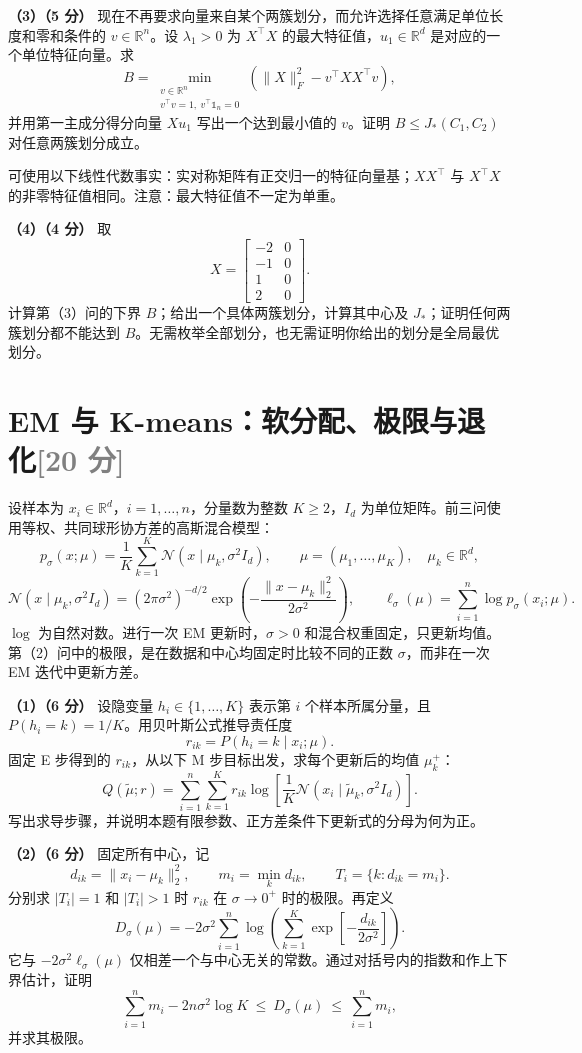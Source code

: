 \documentclass[11pt,a4paper]{article}
\newcommand{\R}{\mathbb R}
\newcommand{\partq}[2]{\par\Needspace{6\baselineskip}\noindent\textbf{（#1）（#2 分）}}
\begin{document}
\partq{3}{5} 现在不再要求向量来自某个两簇划分，而允许选择任意满足单位长度和零和条件的 $v\in\R^n$。设 $\lambda_1>0$ 为 $X^\top X$ 的最大特征值，$u_1\in\R^d$ 是对应的一个单位特征向量。求
\[
B=\min_{\substack{v\in\R^n\\v^\top v=1,\ v^\top\mathds{1}_n=0}}
\left(\|X\|_F^2-v^\top XX^\top v\right),
\]
并用第一主成分得分向量 $Xu_1$ 写出一个达到最小值的 $v$。证明 $B\leq J_*(C_1,C_2)$ 对任意两簇划分成立。

可使用以下线性代数事实：实对称矩阵有正交归一的特征向量基；$XX^\top$ 与 $X^\top X$ 的非零特征值相同。注意：最大特征值不一定为单重。

\partq{4}{4} 取
\[
X=\begin{bmatrix}-2&0\\-1&0\\1&0\\2&0\end{bmatrix}.
\]
计算第（3）问的下界 $B$；给出一个具体两簇划分，计算其中心及 $J_*$；证明任何两簇划分都不能达到 $B$。无需枚举全部划分，也无需证明你给出的划分是全局最优划分。

\clearpage
\section[EM 与 K-means]{EM 与 K-means：软分配、极限与退化\hfill\textcolor{gray}{[20 分]}}
设样本为 $x_i\in\R^d$，$i=1,\ldots,n$，分量数为整数 $K\geq2$，$I_d$ 为单位矩阵。前三问使用等权、共同球形协方差的高斯混合模型：
\[
p_\sigma(x;\mu)=\frac1K\sum_{k=1}^K\mathcal N(x\mid\mu_k,\sigma^2I_d),
\qquad \mu=(\mu_1,\ldots,\mu_K),\quad \mu_k\in\R^d,
\]
\[
\mathcal N(x\mid\mu_k,\sigma^2I_d)
=(2\pi\sigma^2)^{-d/2}
\exp\!\left(-\frac{\|x-\mu_k\|_2^2}{2\sigma^2}\right),
\qquad \ell_\sigma(\mu)=\sum_{i=1}^n\log p_\sigma(x_i;\mu).
\]
$\log$ 为自然对数。进行一次 EM 更新时，$\sigma>0$ 和混合权重固定，只更新均值。第（2）问中的极限，是在数据和中心均固定时比较不同的正数 $\sigma$，而非在一次 EM 迭代中更新方差。

\partq{1}{6} 设隐变量 $h_i\in\{1,\ldots,K\}$ 表示第 $i$ 个样本所属分量，且 $P(h_i=k)=1/K$。用贝叶斯公式推导责任度
\[
r_{ik}=P(h_i=k\mid x_i;\mu).
\]
固定 E 步得到的 $r_{ik}$，从以下 M 步目标出发，求每个更新后的均值 $\mu_k^+$：
\[
Q(\widetilde\mu;r)
=\sum_{i=1}^n\sum_{k=1}^K
r_{ik}\log\!\left[\frac1K\mathcal N(x_i\mid\widetilde\mu_k,\sigma^2I_d)\right].
\]
写出求导步骤，并说明本题有限参数、正方差条件下更新式的分母为何为正。

\partq{2}{6} 固定所有中心，记
\[
d_{ik}=\|x_i-\mu_k\|_2^2,\qquad
m_i=\min_k d_{ik},\qquad
T_i=\{k:d_{ik}=m_i\}.
\]
分别求 $|T_i|=1$ 和 $|T_i|>1$ 时 $r_{ik}$ 在 $\sigma\to0^+$ 时的极限。再定义
\[
D_\sigma(\mu)
=-2\sigma^2\sum_{i=1}^n
\log\!\left(\sum_{k=1}^K\exp\!\left[-\frac{d_{ik}}{2\sigma^2}\right]\right).
\]
它与 $-2\sigma^2\ell_\sigma(\mu)$ 仅相差一个与中心无关的常数。通过对括号内的指数和作上下界估计，证明
\[
\sum_{i=1}^n m_i-2n\sigma^2\log K
\ \leq\ D_\sigma(\mu)\ \leq\ \sum_{i=1}^n m_i,
\]
并求其极限。
\end{document}
